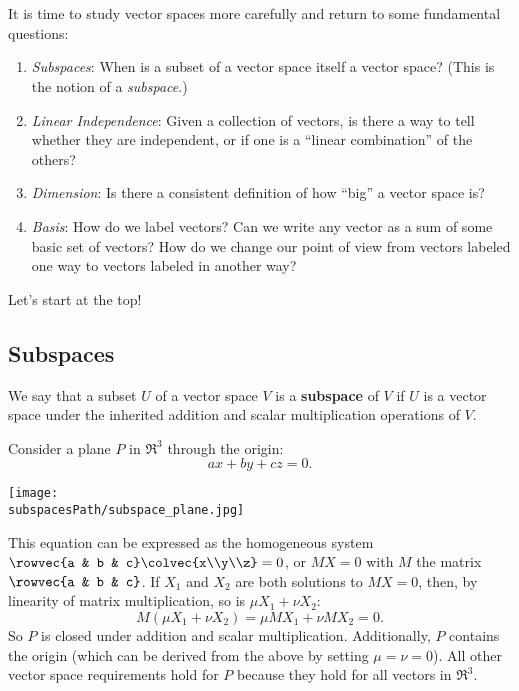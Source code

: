 \chapter{\subspacesTitle}\label{subspacesspanning}

It is time to study vector spaces more carefully and return to  some fundamental questions:

\begin{enumerate}
\item \emph{Subspaces}: When is a subset of a vector space itself a vector space?  (This is the notion of a \emph{subspace}.)

\item \emph{Linear Independence}: Given a collection of vectors, is there a way to tell whether they are independent, or if one is a ``linear combination'' of the others? 

\item \emph{Dimension}: Is there a consistent definition of how ``big'' a vector space is?

\item \emph{Basis}:  How do we label vectors?  Can we write any vector as a sum of some basic set of vectors?  How do we change our point of view from vectors labeled one way to vectors labeled in another way?
\end{enumerate}
Let's start at the top!

\section{Subspaces}

\begin{definition}
We say that a subset $U$ of a vector space $V$ is a {\bfseries subspace} of $V$ if $U$ is a vector space under the inherited addition and scalar multiplication operations of $V$. 
\end{definition}

\begin{example}
Consider a plane $P$ in $\Re^3$ through the origin:
\[
ax+by+cz=0.
\]

\begin{center}
\texttt{[image: \\subspacesPath/subspace\_plane.jpg]}
\end{center}
This equation can be expressed as the homogeneous system $\rowvec{a & b & c}\colvec{x\\y\\z}=0$, or $MX=0$ with $M$ the matrix $\rowvec{a & b & c}$.  If $X_1$ and $X_2$ are both solutions to $MX=0$, then, by linearity of matrix multiplication, so is $\mu X_1 + \nu X_2$:
\[
M(\mu X_1 + \nu X_2) = \mu MX_1 + \nu MX_2 = 0.
\]
So $P$ is closed under addition and scalar multiplication.  Additionally, $P$ contains the origin (which can be derived from the above by setting $\mu=\nu=0$).  All other vector space requirements hold for $P$ because they hold for all vectors in $\Re^3$.
\end{example}



